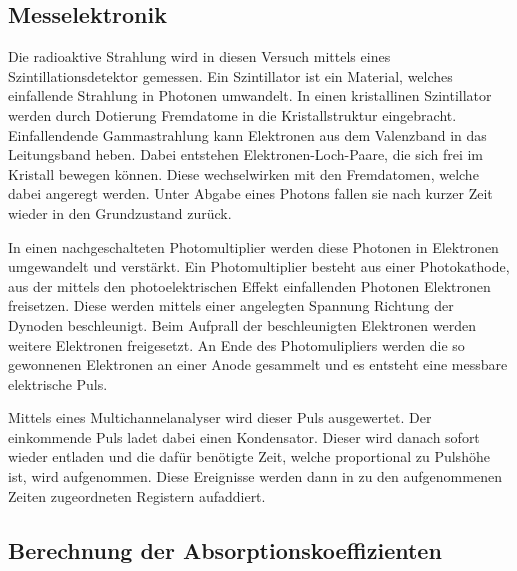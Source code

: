 \subsection{Messelektronik}

Die radioaktive Strahlung wird in diesen Versuch mittels eines Szintillationsdetektor gemessen. Ein Szintillator ist ein Material, welches einfallende Strahlung in Photonen umwandelt.
In einen kristallinen Szintillator werden durch Dotierung Fremdatome in die Kristallstruktur eingebracht. 
Einfallendende Gammastrahlung kann Elektronen aus dem Valenzband in das Leitungsband heben. Dabei entstehen Elektronen-Loch-Paare, die sich frei im Kristall bewegen können. Diese wechselwirken mit den Fremdatomen, welche dabei angeregt werden. Unter Abgabe eines Photons fallen sie nach kurzer Zeit wieder in den Grundzustand zurück.

In einen nachgeschalteten Photomultiplier werden diese Photonen in Elektronen umgewandelt und verstärkt. 
Ein Photomultiplier besteht aus einer Photokathode, aus der  mittels den photoelektrischen Effekt einfallenden Photonen Elektronen freisetzen. Diese werden mittels einer angelegten Spannung Richtung der Dynoden beschleunigt. Beim Aufprall der beschleunigten Elektronen werden weitere Elektronen freigesetzt. 
An Ende des Photomulipliers werden die so gewonnenen Elektronen an einer Anode gesammelt und es entsteht eine messbare elektrische Puls.

Mittels eines Multichannelanalyser wird dieser Puls ausgewertet.
Der einkommende Puls ladet dabei einen Kondensator. Dieser wird danach sofort wieder entladen und die dafür benötigte Zeit, welche proportional zu Pulshöhe ist, wird aufgenommen. Diese Ereignisse werden dann in zu den aufgenommenen Zeiten zugeordneten Registern aufaddiert.


\subsection{Berechnung der Absorptionskoeffizienten}

